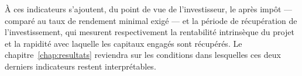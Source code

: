 À ces indicateurs s'ajoutent, du point de vue de l'investisseur, le \TRI après impôt --- comparé au taux de rendement minimal exigé --- et la période de récupération de l'investissement, qui mesurent respectivement la rentabilité intrinsèque du projet et la rapidité avec laquelle les capitaux engagés sont récupérés. Le chapitre~\ref{chap:resultats} reviendra sur les conditions dans lesquelles ces deux derniers indicateurs restent interprétables.
